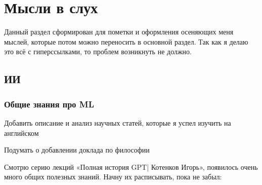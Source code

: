 
\chapter*{Мысли в слух}
\label{ch:notes_informal}

Данный раздел сформирован для пометки и оформления осеняющих меня мыслей, которые потом можно переносить в основной раздел. Так как я делаю это всё с гиперссылками, то проблем возникнуть не должно.\par\vspace{0.3cm}

\par\vspace{0.2cm}

\section*{ИИ}

\subsection*{Общие знания про ML}

Добавить описание и анализ научных статей, которые я успел изучить на английском\par\vspace{0.3cm}

Подумать о добавлении доклада по философии\par\vspace{0.3cm}

\par\vspace{0.2cm}

Смотрю серию лекций «Полная история GPT| Котенков Игорь», появилось очень много общих полезных знаний. Начну их расписывать, пока не забыл:\par\vspace{0.3cm}

